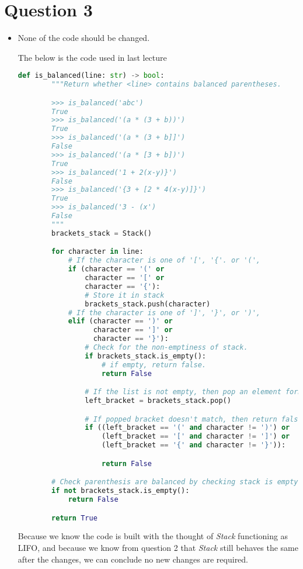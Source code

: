 \documentclass[12pt]{article}
\begin{document}
\section*{Question 3}
\begin{itemize}
    \item

    None of the code should be changed.

    \bigskip

    The below is the code used in last lecture

    \begin{lstlisting}[language=Python,caption={worksheet\_10\_q1b\_solution.py},captionpos=b]
        def is_balanced(line: str) -> bool:
        """Return whether <line> contains balanced parentheses.

        >>> is_balanced('abc')
        True
        >>> is_balanced('(a * (3 + b))')
        True
        >>> is_balanced('(a * (3 + b]]')
        False
        >>> is_balanced('(a * [3 + b])')
        True
        >>> is_balanced('1 + 2(x-y)}')
        False
        >>> is_balanced('{3 + [2 * 4(x-y)]}')
        True
        >>> is_balanced('3 - (x')
        False
        """
        brackets_stack = Stack()

        for character in line:
            # If the character is one of '[', '{'. or '(',
            if (character == '(' or
                character == '[' or
                character == '{'):
                # Store it in stack
                brackets_stack.push(character)
            # If the character is one of ']', '}', or ')',
            elif (character == ')' or
                  character == ']' or
                  character == '}'):
                # Check for the non-emptiness of stack.
                if brackets_stack.is_empty():
                    # if empty, return false.
                    return False

                # If the list is not empty, then pop an element form stack.
                left_bracket = brackets_stack.pop()

                # If popped bracket doesn't match, then return false
                if ((left_bracket == '(' and character != ')') or
                    (left_bracket == '[' and character != ']') or
                    (left_bracket == '{' and character != '}')):

                    return False

        # Check parenthesis are balanced by checking stack is empty.
        if not brackets_stack.is_empty():
            return False

        return True
    \end{lstlisting}

    \bigskip

    Because we know the code is built with the thought of \textit{Stack} functioning
    as LIFO, and because we know from question 2 that \textit{Stack} still behaves
    the same after the changes, we can conclude no new changes are required.

\end{itemize}
\end{document}
